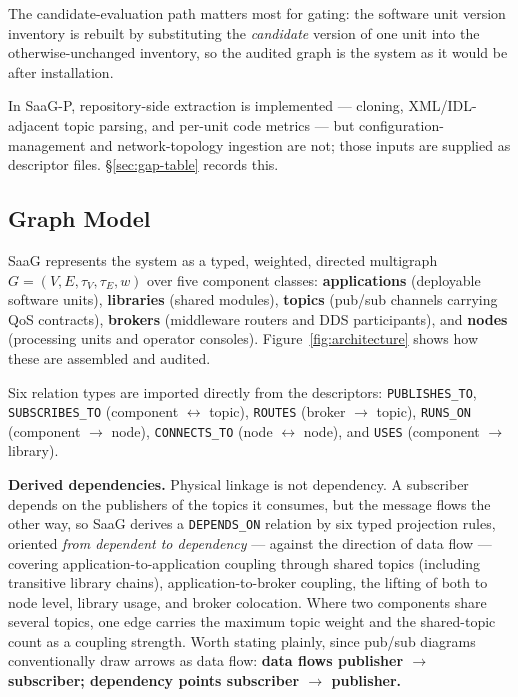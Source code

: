 \documentclass[sigconf,9pt]{acmart}
\begin{document}
The candidate-evaluation path matters most for gating: the software unit version inventory is
rebuilt by substituting the \emph{candidate} version of one unit into the otherwise-unchanged
inventory, so the audited graph is the system as it would be after installation.

In SaaG-P, repository-side extraction is implemented --- cloning, XML/IDL-adjacent topic parsing, and
per-unit code metrics --- but configuration-management and network-topology ingestion are not; those
inputs are supplied as descriptor files. \S\ref{sec:gap-table} records this.

\subsection{Graph Model}
\label{sec:graphmodel}

SaaG represents the system as a typed, weighted, directed multigraph
$G = (V, E, \tau_V, \tau_E, w)$ over five component classes: \textbf{applications} (deployable
software units), \textbf{libraries} (shared modules), \textbf{topics} (pub/sub channels carrying QoS
contracts), \textbf{brokers} (middleware routers and DDS participants), and \textbf{nodes}
(processing units and operator consoles). Figure~\ref{fig:architecture} shows how these are
assembled and audited.

Six relation types are imported directly from the descriptors: \texttt{PUBLISHES\_TO},
\texttt{SUBSCRIBES\_TO} (component $\leftrightarrow$ topic), \texttt{ROUTES} (broker
$\rightarrow$ topic), \texttt{RUNS\_ON} (component $\rightarrow$ node), \texttt{CONNECTS\_TO} (node
$\leftrightarrow$ node), and \texttt{USES} (component $\rightarrow$ library).

\textbf{Derived dependencies.} Physical linkage is not dependency. A subscriber depends on the
publishers of the topics it consumes, but the message flows the other way, so SaaG derives a
\texttt{DEPENDS\_ON} relation by six typed projection rules, oriented \emph{from dependent to
dependency} --- against the direction of data flow --- covering application-to-application coupling
through shared topics (including transitive library chains), application-to-broker coupling, the
lifting of both to node level, library usage, and broker colocation. Where two components share
several topics, one edge carries the maximum topic weight and the shared-topic count as a coupling
strength. Worth stating plainly, since pub/sub diagrams conventionally draw arrows as data flow:
\textbf{data flows publisher $\rightarrow$ subscriber; dependency points subscriber $\rightarrow$
publisher.}
\end{document}
